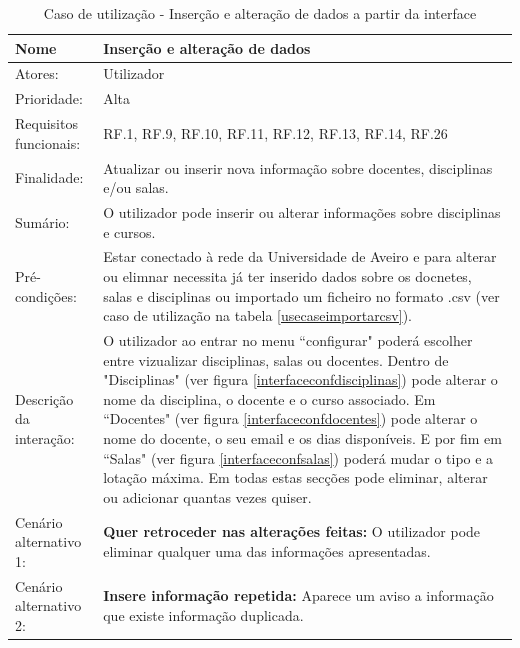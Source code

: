\documentclass[11pt, twoside]{report}
\begin{document}
	\def\arraystretch{1.5}
\begin{table}[H]
	\caption{Caso de utilização - Inserção e alteração de dados a partir da interface}
	\begin{center}	
		\begin{tabularx}{\textwidth}{|l|X|}
			\hline
			\textbf{Nome }	& \textbf{Inserção e alteração de dados} \\
			\hline
			Atores: & Utilizador \\
			\hline
			Prioridade: & Alta \\
			\hline
			Requisitos funcionais:& RF.1, RF.9, RF.10, RF.11, RF.12, RF.13, RF.14, RF.26 \\
			\hline
			Finalidade: & Atualizar ou inserir nova informação sobre docentes, disciplinas e/ou salas.\\
			\hline
			Sumário: &  O utilizador pode inserir ou alterar informações sobre disciplinas e cursos.\\
			\hline
			Pré-condições: & Estar conectado à rede da Universidade de Aveiro e para alterar ou elimnar necessita já ter inserido dados sobre os docnetes, salas e disciplinas ou importado um ficheiro no formato .csv (ver caso de utilização na tabela \ref{usecaseimportarcsv}).\\
			\hline
			Descrição da interação: &  O utilizador ao entrar no menu ``configurar" poderá escolher entre vizualizar disciplinas, salas ou docentes. Dentro de "Disciplinas" (ver figura \ref{interfaceconfdisciplinas}) pode alterar o nome da disciplina, o docente e o curso associado. Em ``Docentes" (ver figura \ref{interfaceconfdocentes}) pode alterar o nome do docente, o seu email e os dias disponíveis. E por fim em ``Salas" (ver figura \ref{interfaceconfsalas}) poderá mudar o tipo e a lotação máxima. Em todas estas secções pode eliminar, alterar ou adicionar quantas vezes quiser.\\
			\hline
			Cenário alternativo 1:&\textbf{Quer retroceder nas alterações feitas:} O utilizador pode eliminar qualquer uma das informações apresentadas.\\
			\hline
			Cenário alternativo 2:&\textbf{Insere informação repetida:} Aparece um aviso a informação que existe informação duplicada.\\
			\hline
		\end{tabularx}
	\end{center}
\end{table}
\end{document}
